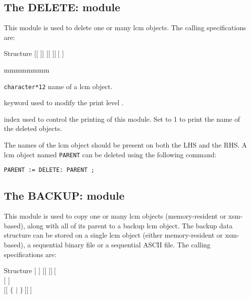 \clearpage

\subsection{The DELETE: module}\label{sect:DELETEData}

This module is used to delete one or many {\sc lcm} objects. The calling
specifications are:

\begin{DataStructure}{Structure }
$[[$  $]]$ \moc{:=}  $[[$  $]]~[$ \moc{::}   $]$ \moc{;}
\end{DataStructure}

\begin{ListeDeDescription}{mmmmmmmm}

\item[\dusa{NAME1}] {\tt character*12} name of a {\sc lcm} object.

\item[\moc{EDIT}] keyword used to modify the print level .

\item[\dusa{iprint}] index used to control the printing of this module. Set to 1 to
print the name of the deleted objects.

\end{ListeDeDescription}

The names of the {\sc lcm} object should be present on both the LHS and
the RHS. A {\sc lcm} object named {\tt PARENT} can be deleted using the following command:

\begin{verbatim}
PARENT := DELETE: PARENT ;
\end{verbatim}

\clearpage

\subsection{The BACKUP: module}\label{sect:BACKUPData}

This module is used to copy one or many {\sc lcm} objects (memory-resident or {\sc xsm}-based), along with all of its parent to a backup {\sc lcm} object. The backup data
structure can be stored on a single {\sc lcm} object (either memory-resident or {\sc xsm}-based), a sequential binary
file or a sequential ASCII file. The calling specifications are:

\begin{DataStructure}{Structure }
 \moc{:=}  $[$  $]$ $[[$  $]]~[$ \moc{::} \\
 $[$   $]$ \\
 $[[$  $\{$   $|$   $\}~]]~]$ \moc{;}
\end{DataStructure}

